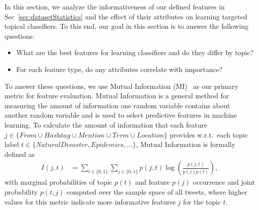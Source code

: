 In this section, we analyze the informativeness of our defined
features in Sec~\ref{sec:datasetStatistics} and the effect of their
attributes on learning targeted topical classifiers. To this end,
our goal in this section is to answer the following questions:
\begin{itemize}
\item What are the best features for learning classifiers and do they differ by topic?
\item For each feature type, do any attributes correlate with importance?
\end{itemize}
To answer these questions, we use Mutual Information (MI)~\cite{manning_ir} as our primary
metric for feature evaluation.  Mutual Information is a general method
for measuring the amount of information one random variable contains
about another random variable and is used to select
predictive features in machine learning.  To calculate the amount of
information that each feature
$j \in \{ \textit{From} \cup \textit{Hashtag} \cup \textit{Mention} \cup \textit{Term} \cup \textit{Location} \}$
provides w.r.t.\ each topic label $t \in \{NaturalDisaster, Epidemics,...\}$,
Mutual Information is formally defined as 
\begin{align*}
I(j, t) & = \!\!\! \sum_{t \in \{ \mathrm{0}, \mathrm{1} \}} \sum_{j \in \{ \mathrm{0}, \mathrm{1}\}}p(j,t)\log \left ( \frac{p(j,t)}{p(j)p(t)} \right ) , 
 \label{eq:eq1}
\end{align*}
with marginal probabilities of topic $p(t)$ and feature $p(j)$ occurrence and joint probability $p(t,j)$ computed over the sample space of all tweets, 
where higher values for this metric indicate more informative features $j$ for the topic $t$.


